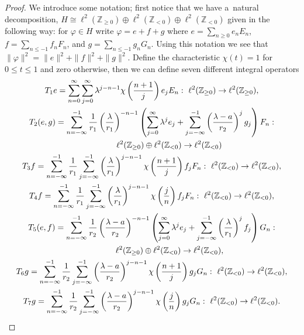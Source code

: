 \begin{proof}
We introduce some notation; f\/irst notice that we have a~natural decomposition, $H \!\cong\! \ell^2({\mathbb Z}_{\ge0})
\oplus \ell^2({\mathbb Z}_{<0}) \oplus \ell^2({\mathbb Z}_{<0})$ given in the following way: for $\varphi\in H$ write
$\varphi=e+f+g$ where $e=\sum\limits_{n\ge0}e_nE_n$, $f= \sum\limits_{n\le-1}f_nF_n$, and $g=\sum\limits_{n\le-1}g_nG_n$.
Using this notation we see that $\|\varphi\|^2=\|e\|^2+\|f\|^2+\|g\|^2$.
Def\/ine the characteristic $\chi(t)=1$ for $0\le t\le1$ and zero otherwise, then we can def\/ine seven dif\/ferent integral operators
\begin{gather}
T_1e=\sum\limits_{n=0}^\infty\sum\limits_{j=0}^\infty \lambda^{j-n-1}\chi\left(\frac{n+1}{j}\right)e_jE_n: \
\ell^2({\mathbb Z}_{\ge0})\to\ell^2({\mathbb Z}_{\ge0}),
\nonumber
\\
T_2(e,g)=\sum\limits_{n=-\infty}^{-1}\frac{1}{r_1}\left(\frac{\lambda}{r_1}\right)^{-n-1}\left(\sum\limits_{j=0}^\infty\lambda^je_j
+ \sum\limits_{j=-\infty}^{-1}\left(\frac{\lambda-a}{r_2}\right)^jg_j\right)F_n :
\nonumber
\\
\hphantom{T_2(e,g)=}{} \ell^2({\mathbb Z}_{\ge0})\oplus\ell^2({\mathbb Z}_{<0})\to\ell^2({\mathbb Z}_{<0})
\nonumber
\\
T_3f =
\sum\limits_{n=-\infty}^{-1}\frac{1}{r_1}\sum\limits_{j=-\infty}^{-1}\left(\frac{\lambda}{r_1}\right)^{j-n-1}\chi\left(\frac{n+1}{j}\right)f_jF_n: \
\ell^2({\mathbb Z}_{<0})\to\ell^2({\mathbb Z}_{<0}),
\nonumber
\\
\label{int_ops_resolvent_z}
T_4f =
\sum\limits_{n=-\infty}^{-1}\frac{1}{r_1}\sum\limits_{j=-\infty}^{-1}\left(\frac{\lambda}{r_1}\right)^{j-n-1}\chi\left(\frac{j}{n}\right)f_jF_n: \
\ell^2({\mathbb Z}_{<0})\to\ell^2({\mathbb Z}_{<0}),
\\
T_5(e,f) =\sum\limits_{n=-\infty}^{-1}\frac{1}{r_2}\left(\frac{\lambda-a}{r_2}\right)^{-n-1}
\left(\sum\limits_{j=0}^\infty\lambda^je_j+\sum\limits_{j=-\infty}^{-1}\left(\frac{\lambda}{r_1}\right)^jf_j\right)G_n:
\nonumber
\\
\hphantom{T_5(e,f) =}{} \ell^2({\mathbb Z}_{\ge0})\oplus\ell^2({\mathbb Z}_{<0})\to\ell^2({\mathbb Z}_{<0}),
\nonumber
\\
T_6g=\sum\limits_{n=-\infty}^{-1}\frac{1}{r_2}\sum\limits_{j=-\infty}^{-1}\left(\frac{\lambda-a}{r_2}\right)^{j-n-1}
\chi\left(\frac{n+1}{j}\right)g_j G_n: \ \ell^2({\mathbb Z}_{<0})\to\ell^2({\mathbb Z}_{<0}),
\nonumber
\\
T_7g=\sum\limits_{n=-\infty}^{-1}\frac{1}{r_2}\sum\limits_{j=-\infty}^{-1}\left(\frac{\lambda-a}{r_2}\right)^{j-n-1}
\chi\left(\frac{j}{n}\right)g_j G_n: \  \ell^2({\mathbb Z}_{<0})\to\ell^2({\mathbb Z}_{<0}).
\nonumber
\end{gather}


\end{proof}
